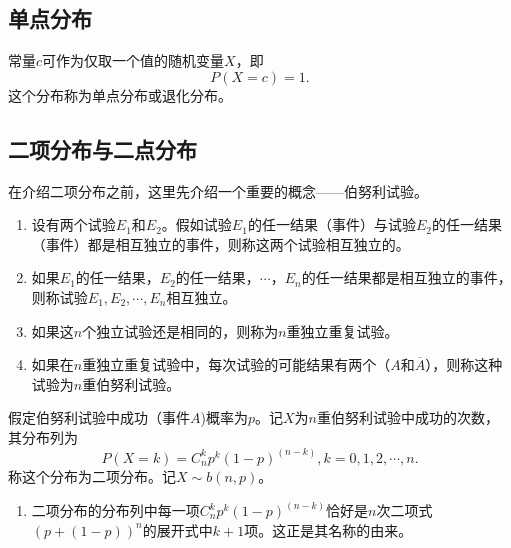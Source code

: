 \subsection{单点分布}
\begin{definition}\label{def:one_point_dist}
    常量$c$可作为仅取一个值的随机变量$X$，即
$$
P(X = c) = 1.
$$
这个分布称为单点分布或退化分布。
\end{definition}
\begin{note}
    \vspace{5cm}
\end{note}
\subsection{二项分布与二点分布}
在介绍二项分布之前，这里先介绍一个重要的概念——伯努利试验。
\begin{definition}\label{def:Bernoulli_experiment}
\begin{enumerate}
    \item 设有两个试验$E_1$和$E_2$。假如试验$E_1$的任一结果（事件）与试验$E_2$的任一结果（事件）都是相互独立的事件，则称这两个试验相互独立的。
    \item 如果$E_1$的任一结果，$E_2$的任一结果，$\cdots$，$E_n$的任一结果都是相互独立的事件，则称试验$E_1,E_2,\cdots,E_n$相互独立。
    \item 如果这$n$个独立试验还是相同的，则称为$n$重独立重复试验。
    \item 如果在$n$重独立重复试验中，每次试验的可能结果有两个（$A$和$\overline{A}$），则称这种试验为$n$重伯努利试验。
\end{enumerate}
\end{definition}

\begin{definition}\label{def:Binomial_dist}
假定伯努利试验中成功（事件$A$)概率为$p$。记$X$为$n$重伯努利试验中成功的次数，其分布列为
$$
P(X=k) = C_n^k p^k (1-p)^{(n-k)}, k=0,1,2,\cdots,n.
$$
称这个分布为二项分布。记$X\sim b(n,p)$。
\end{definition}
\begin{remark}
\begin{enumerate}
    \item 二项分布的分布列中每一项$C_n^k p^k (1-p)^{(n-k)}$恰好是$n$次二项式$(p+(1-p))^n$的展开式中$k+1$项。这正是其名称的由来。
\end{enumerate}
\end{remark}


